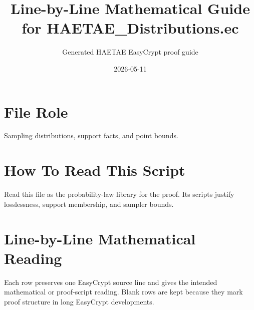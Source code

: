 \documentclass[10pt]{article}
\title{Line-by-Line Mathematical Guide for HAETAE\_Distributions.ec}
\author{Generated HAETAE EasyCrypt proof guide}
\date{2026-05-11}
\begin{document}
\maketitle

\section*{File Role}
Sampling distributions, support facts, and point bounds.

\section*{How To Read This Script}
Read this file as the probability-law library for the proof.  Its scripts justify losslessness, support membership, and sampler bounds.

\section*{Line-by-Line Mathematical Reading}
Each row preserves one EasyCrypt source line and gives the intended mathematical
or proof-script reading.  Blank rows are kept because they mark proof structure
in long EasyCrypt developments.
\end{document}
